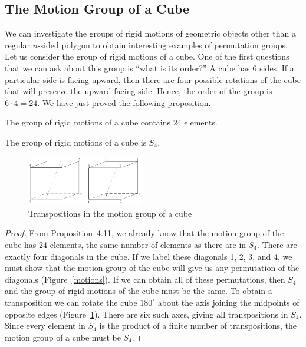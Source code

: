  
 
 
\subsection*{The Motion Group of a Cube}
 
 
We can investigate the groups of rigid motions of  geometric
objects other than a regular $n$-sided polygon to obtain interesting
examples of permutation groups. Let us consider the group of rigid
motions of a cube. One of the first questions that we can ask about
this group is ``what is its order?''  A cube has 6 sides. If
a particular side is facing upward, then there are four possible
rotations of the cube that will preserve the upward-facing side.
Hence, the order of the group is $6 \cdot 4 = 24$. We have just proved
the following proposition.
 
 
\begin{proposition}
The group of rigid motions of a cube contains $24$ elements.
\end{proposition}
 
 
\begin{theorem}
The group of rigid motions of a cube is $S_4$.
\end{theorem}
 

 
\begin{figure}[hbt]
\begin{center}
\centerline {
\includegraphics[width=2in]{transpose}
}
\end{center}
\caption{Transpositions in the motion group of a cube}
\label{transpose}
\end{figure}
 
 

 
\begin{proof}
From Proposition~4.11, we already know that the motion group of the
cube has 24 elements, the same number of elements as there are in
$S_4$.  There are exactly four diagonals in the cube.  If we label
these diagonals 1, 2, 3, and 4, we must show that the motion group of
the cube will give us any permutation of the diagonals
(Figure~\ref{motions}). If we can obtain all of these permutations,
then $S_4$ and the group of rigid motions of the cube must be the
same. To obtain a transposition we can rotate the cube $180^{\circ}$
about the axis joining the midpoints of opposite edges
(Figure~\ref{transpose}). There are six such axes, giving all
transpositions in $S_4$. Since every element in $S_4$ is the product
of a finite number of transpositions, the motion group of a cube
must be $S_4$.
\mbox{\hspace{1in}}
\end{proof}
 
